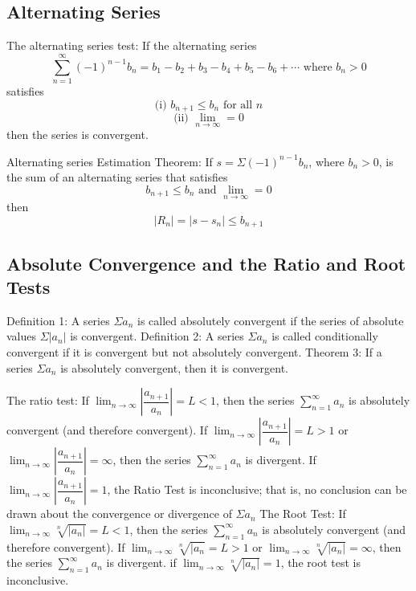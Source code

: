 \documentclass{article}
\begin{document}
    \subsection{Alternating Series}
    \begin{outline}
        \1 The alternating series test: If the alternating series \[\sum^\infty_{n=1}(-1)^{n-1}b_n=b_1-b_2+b_3-b_4+b_5-b_6+\cdots \mbox{ where } b_n>0\] satisfies \[\mbox{(i) }b_{n+1}\leq b_n\mbox{ for all }n\]\[\mbox{(ii) }\lim_{n\to\infty}=0\] then the series is convergent. 
    \end{outline}
    \begin{multicols}{2}
        \begin{outline}
        \1 Alternating series Estimation Theorem: If \(s=\Sigma (-1)^{n-1}b_n\), where \(b_n>0\), is the sum of an alternating series that satisfies \[b_{n+1}\leq b_n\mbox{ and }\lim_{n\to\infty}=0\] then \[|R_n|=|s-s_n|\leq b_{n+1}\]
    \end{outline}
    \subsection{Absolute Convergence and the Ratio and Root Tests}
    \begin{outline}
        \1 Definition 1: A series \(\Sigma a_n\) is called absolutely convergent if the series of absolute values \(\Sigma|a_n|\) is convergent. 
        \1 Definition 2: A series \(\Sigma a_n\) is called conditionally convergent if it is convergent but not absolutely convergent. 
        \1 Theorem 3: If a series \(\Sigma a_n\) is absolutely convergent, then it is convergent. 
    \end{outline}
\end{multicols}
\begin{outline}
    
        \1 The ratio test: 
            \2 If \(\lim_{n\to\infty}\left|\dfrac{a_{n+1}}{a_n}\right|=L<1\), then the series \(\sum^\infty_{n=1}a_n\) is absolutely convergent (and therefore convergent). 
            \2 If \(\lim_{n\to\infty}\left|\dfrac{a_{n+1}}{a_n}\right|=L>1\) or \(\lim_{n\to\infty}\left|\dfrac{a_{n+1}}{a_n}\right|=\infty\), then the series \(\sum^\infty_{n=1}a_n\) is divergent. 
            \2 If \(\lim_{n\to\infty}\left|\dfrac{a_{n+1}}{a_n}\right|=1\), the Ratio Test is inconclusive; that is, no conclusion can be drawn about the convergence or divergence of \(\Sigma a_n\)
        \1 The Root Test: 
            \2 If \(\lim_{n\to\infty}\sqrt[n]{|a_n|}=L<1\), then the series \(\sum^\infty_{n=1}a_n\) is absolutely convergent (and therefore convergent). 
            \2 If \(\lim_{n\to\infty}\sqrt[n]{|a_n}=L>1\) or \(\lim_{n\to\infty}\sqrt[n]{|a_n|}=\infty\), then the series \(\sum^\infty_{n=1}a_n\) is divergent. 
            \2 if \(\lim_{n\to\infty}\sqrt[n]{|a_n|}=1\), the root test is inconclusive. 
    
        \end{outline}
\end{document}
